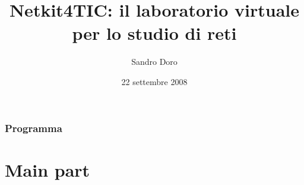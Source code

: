 \documentclass{beamer}
\title{Netkit4TIC: il laboratorio virtuale per lo studio di reti}
\author{Sandro Doro}
\institute[ITIS ``C.Zuccante'' - Venezia--Mestre]{
  ITIS ``C.Zuccante'' - Venezia--Mestre\\
  Corso Serale Sirio}
\date{22 settembre 2008}
\begin{document}
\frame{\titlepage
}

\section*{Programma}



\part{Main part}

\end{document}
